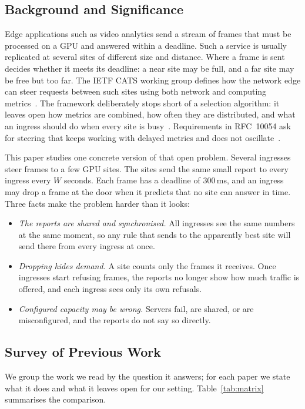 \documentclass[conference]{IEEEtran}
\begin{document}
\subsection{Background and Significance}
Edge applications such as video analytics send a stream of frames that must be processed on a GPU and answered within a deadline. Such a service is usually replicated at several sites of different size and distance. Where a frame is sent decides whether it meets its deadline: a near site may be full, and a far site may be free but too far. The IETF CATS working group defines how the network edge can steer requests between such sites using both network and computing metrics~\cite{rfc10053,rfc10054}. The framework deliberately stops short of a selection algorithm: it leaves open how metrics are combined, how often they are distributed, and what an ingress should do when every site is busy~\cite{rfc10053,catsmetrics}. Requirements in RFC~10054 ask for steering that keeps working with delayed metrics and does not oscillate~\cite{rfc10054}.

This paper studies one concrete version of that open problem. Several ingresses steer frames to a few GPU sites. The sites send the same small report to every ingress every $W$ seconds. Each frame has a deadline of 300\,ms, and an ingress may drop a frame at the door when it predicts that no site can answer in time. Three facts make the problem harder than it looks:
\begin{itemize}
\item \emph{The reports are shared and synchronised.} All ingresses see the same numbers at the same moment, so any rule that sends to the apparently best site will send there from every ingress at once.
\item \emph{Dropping hides demand.} A site counts only the frames it receives. Once ingresses start refusing frames, the reports no longer show how much traffic is offered, and each ingress sees only its own refusals.
\item \emph{Configured capacity may be wrong.} Servers fail, are shared, or are misconfigured, and the reports do not say so directly.
\end{itemize}

\subsection{Survey of Previous Work}\label{sec:survey}
We group the work we read by the question it answers; for each paper we state what it does and what it leaves open for our setting. Table~\ref{tab:matrix} summarises the comparison.
\end{document}
